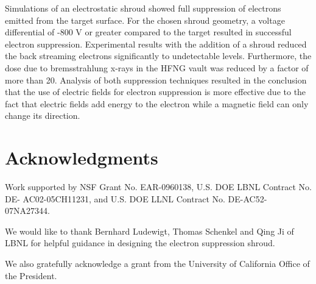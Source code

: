 \documentclass[aps,prstab,twocolumn,superscriptaddress]{revtex4-1}
\begin{document}
Simulations of an electrostatic shroud showed full suppression of electrons emitted from the target surface. For the chosen shroud geometry, a voltage differential of -800 V or greater compared to the target resulted in successful electron suppression. Experimental results with the addition of a shroud reduced the back streaming electrons significantly to undetectable levels. Furthermore, the dose due to bremsstrahlung x-rays in the HFNG vault was reduced by a factor of more than 20. Analysis of both suppression techniques resulted in the conclusion that the use of electric fields for electron suppression is more effective due to the fact that electric fields add energy to the electron while a magnetic field can only change its direction.

\section{Acknowledgments}

Work supported by NSF Grant No. EAR-0960138, U.S. DOE LBNL Contract No. DE- AC02-05CH11231, and U.S. DOE LLNL Contract No. DE-AC52-07NA27344.

We would like to thank Bernhard Ludewigt, Thomas Schenkel and Qing Ji of LBNL for helpful guidance in designing the electron suppression shroud.

We also gratefully acknowledge a grant from the University of California Office of the President.
%



\end{document}
